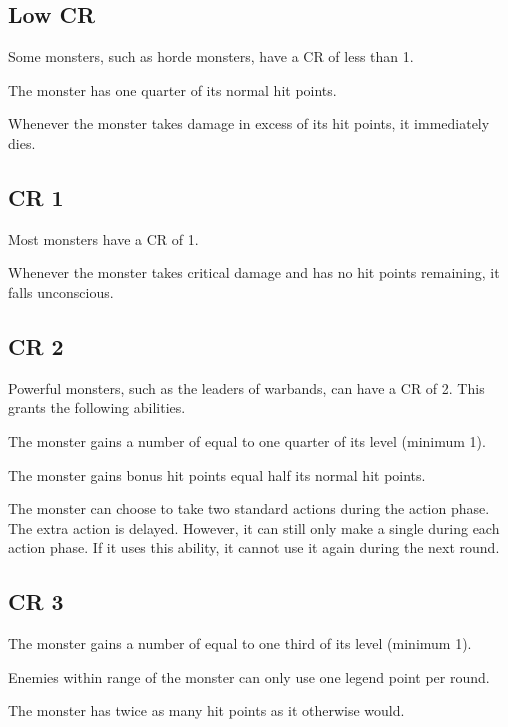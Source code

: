     \subsection{Low CR}
        Some monsters, such as horde monsters, have a CR of less than 1.

         The monster has one quarter of its normal hit points.

         Whenever the monster takes damage in excess of its hit points, it immediately dies.

    \subsection{CR 1}
        Most monsters have a CR of 1.

         Whenever the monster takes critical damage and has no hit points remaining, it falls unconscious.

    \subsection{CR 2}
        Powerful monsters, such as the leaders of warbands, can have a CR of 2.
        This grants the following abilities.

         The monster gains a number of  equal to one quarter of its level (minimum 1).

         The monster gains bonus hit points equal half its normal hit points.

         The monster can choose to take two standard actions during the action phase.
        The extra action is delayed.
        However, it can still only make a single  during each action phase.
        If it uses this ability, it cannot use it again during the next round.

    \subsection{CR 3}

         The monster gains a number of  equal to one third of its level (minimum 1).

         Enemies within \rnglong range of the monster can only use one legend point per round.

         The monster has twice as many hit points as it otherwise would.

